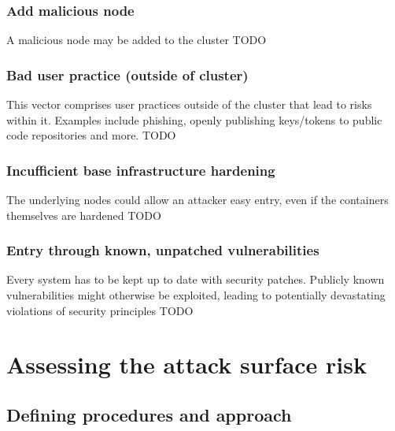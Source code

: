 \subsection{Add malicious node}
A malicious node may be added to the cluster
TODO

\subsection{Bad user practice (outside of cluster)}
This vector comprises user practices outside of the cluster that lead to risks within it. Examples include phishing, openly publishing keys/tokens to public code repositories and more.
TODO


\subsection{Incufficient base infrastructure hardening}
The underlying nodes could allow an attacker easy entry, even if the containers themselves are hardened
TODO

\subsection{Entry through known, unpatched vulnerabilities}
Every system has to be kept up to date with  security patches. Publicly known vulnerabilities might otherwise be exploited, leading to potentially devastating violations of security principles
TODO


\chapter{Assessing the attack surface risk}

\section{Defining procedures and approach}

